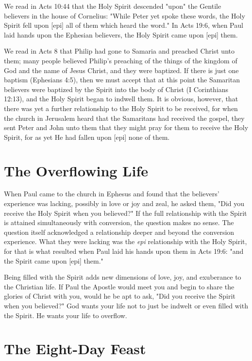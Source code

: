 We read in Acts 10:44 that the Holy Spirit descended "upon" the Gentile believers in the house of Cornelius: "While Peter yet spoke these words, the Holy Spirit fell upon [epi] all of them which heard the word." In Acts 19:6, when Paul laid hands upon the Ephesian believers, the Holy Spirit came upon [epi] them. 

We read in Acts 8 that Philip had gone to Samaria and preached Christ unto them; many people believed Philip's preaching of the things of the kingdom of God and the name of Jesus Christ, and they were baptized. If there is just one baptism (Ephesians 4:5), then we must accept that at this point the Samaritan believers were baptized by the Spirit into the body of Christ (I Corinthians 12:13), and the Holy Spirit began to indwell them. It is obvious, however, that there was yet a further relationship to the Holy Spirit to be received, for when the church in Jerusalem heard that the Samaritans had received the gospel, they sent Peter and John unto them that they might pray for them to receive the Holy Spirit, for as yet He had fallen upon [epi] none of them. 

\section*{The Overflowing Life}

When Paul came to the church in Ephesus and found that the believers' experience was lacking, possibly in love or joy and zeal, he asked them, "Did you receive the Holy Spirit when you believed?" If the full relationship with the Spirit is attained simultaneously with conversion, the question makes no sense. The question itself acknowledged a relationship deeper and beyond the conversion experience. What they were lacking was the \emph{epi} relationship with the Holy Spirit, for that is what resulted when Paul laid his hands upon them in Acts 19:6: "and the Spirit came upon [epi] them." 

Being filled with the Spirit adds new dimensions of love, joy, and exuberance to the Christian life. If Paul the Apostle would meet you and begin to share the glories of Christ with you, would he be apt to ask, "Did you receive the Spirit when you believed?" God wants your life not to just be indwelt or even filled with the Spirit. He wants your life to overflow. 

\section*{The Eight-Day Feast}

